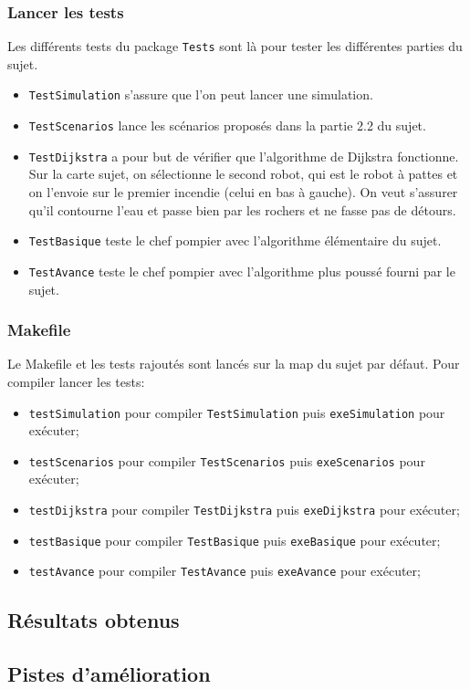 \documentclass[a4paper,8pt]{article} %
\begin{document}
\subsubsection{Lancer les tests}
Les différents tests du package \texttt{Tests} sont là pour tester les différentes parties du sujet.
\begin{itemize}
    \item \texttt{TestSimulation} s'assure que l'on peut lancer une simulation.
    \item \texttt{TestScenarios} lance les scénarios proposés dans la partie 2.2 du sujet.
    \item \texttt{TestDijkstra} a pour but de vérifier que l'algorithme de Dijkstra fonctionne. Sur la carte sujet, 
    on sélectionne le second robot, qui est le robot à pattes et on l'envoie sur le premier incendie (celui en bas à gauche).
    On veut s'assurer qu'il contourne l'eau et passe bien par les rochers et ne fasse pas de détours.
    \item \texttt{TestBasique} teste le chef pompier avec l'algorithme élémentaire du sujet.
    \item \texttt{TestAvance} teste le chef pompier avec l'algorithme plus poussé fourni par le sujet.
\end{itemize}

\subsubsection{Makefile}
Le Makefile et les tests rajoutés sont lancés sur la map du sujet par défaut.
Pour compiler lancer les tests: 
\begin{itemize}
    \item \texttt{testSimulation} pour compiler \texttt{TestSimulation} puis \texttt{exeSimulation} pour exécuter;
    \item \texttt{testScenarios} pour compiler \texttt{TestScenarios} puis \texttt{exeScenarios} pour exécuter;
    \item \texttt{testDijkstra} pour compiler \texttt{TestDijkstra} puis \texttt{exeDijkstra} pour exécuter;
    \item \texttt{testBasique} pour compiler \texttt{TestBasique} puis \texttt{exeBasique} pour exécuter;
    \item \texttt{testAvance} pour compiler \texttt{TestAvance} puis \texttt{exeAvance} pour exécuter;
\end{itemize}


\subsection{Résultats obtenus}
\subsection{Pistes d'amélioration}
\end{document}
